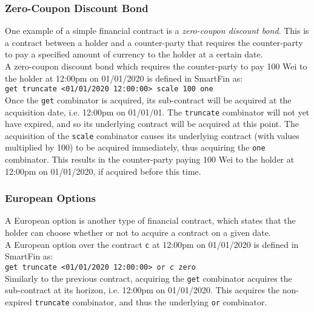 \subsubsection{Zero-Coupon Discount Bond}

One example of a simple financial contract is a \textit{zero-coupon discount bond}. This is a contract between a holder and a counter-party that requires the counter-party to pay a specified amount of currency to the holder at a certain date. \\

A zero-coupon discount bond which requires the counter-party to pay 100 Wei to the holder at 12:00pm on 01/01/2020 is defined in SmartFin as: \\

\texttt{get truncate <01/01/2020 12:00:00> scale 100 one} \\

Once the \texttt{get} combinator is acquired, its sub-contract will be acquired at the acquisition date, i.e. 12:00pm on 01/01/01. The \texttt{truncate} combinator will not yet have expired, and so its underlying contract will be acquired at this point. The acquisition of the \texttt{scale} combinator causes its underlying contract (with values multiplied by 100) to be acquired immediately, thus acquiring the \texttt{one} combinator. This results in the counter-party paying 100 Wei to the holder at 12:00pm on 01/01/2020, if acquired before this time.


\subsubsection{European Options}

A European option is another type of financial contract, which states that the holder can choose whether or not to acquire a contract on a given date. \\

A European option over the contract \texttt{c} at 12:00pm on 01/01/2020 is defined in SmartFin as: \\

\texttt{get truncate <01/01/2020 12:00:00> or \textit{c} zero} \\

Similarly to the previous contract, acquiring the \texttt{get} combinator acquires the sub-contract at its horizon, i.e. 12:00pm on 01/01/2020. This acquires the non-expired \texttt{truncate} combinator, and thus the underlying \texttt{or} combinator. \\

